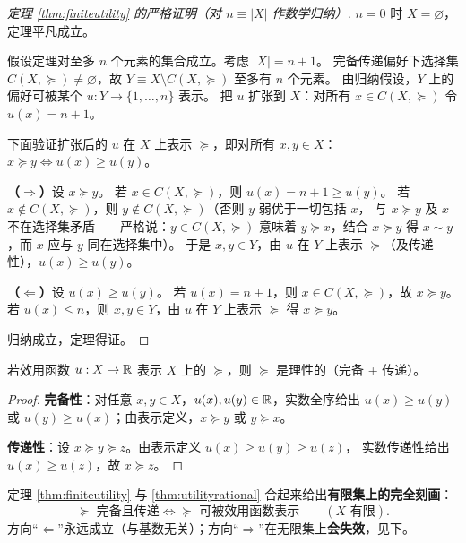 \begin{proof}[定理 \ref{thm:finiteutility} 的严格证明（对 $n\equiv|X|$ 作数学归纳）]
$n=0$ 时 $X=\varnothing$，定理平凡成立。

假设定理对至多 $n$ 个元素的集合成立。考虑 $|X|=n+1$。
完备传递偏好下选择集 $C(X,\succeq)\neq\varnothing$，故
$Y\equiv X\setminus C(X,\succeq)$ 至多有 $n$ 个元素。
由归纳假设，$Y$ 上的偏好可被某个 $u: Y\to\{1,\dots,n\}$ 表示。
把 $u$ 扩张到 $X$：对所有 $x\in C(X,\succeq)$ 令 $u(x)=n+1$。

下面验证扩张后的 $u$ 在 $X$ 上表示 $\succeq$，即对所有 $x,y\in X$：
$x\succeq y \iff u(x)\ge u(y)$。

\textbf{（$\Rightarrow$）}设 $x\succeq y$。
若 $x\in C(X,\succeq)$，则 $u(x)=n+1\ge u(y)$。
若 $x\notin C(X,\succeq)$，则 $y\notin C(X,\succeq)$（否则 $y$ 弱优于一切包括 $x$，
与 $x\succeq y$ 及 $x$ 不在选择集矛盾——严格说：$y\in C(X,\succeq)$ 意味着
$y\succeq x$，结合 $x\succeq y$ 得 $x\sim y$，而 $x$ 应与 $y$ 同在选择集中）。
于是 $x,y\in Y$，由 $u$ 在 $Y$ 上表示 $\succeq$（及传递性），$u(x)\ge u(y)$。

\textbf{（$\Leftarrow$）}设 $u(x)\ge u(y)$。
若 $u(x)=n+1$，则 $x\in C(X,\succeq)$，故 $x\succeq y$。
若 $u(x)\le n$，则 $x,y\in Y$，由 $u$ 在 $Y$ 上表示 $\succeq$ 得 $x\succeq y$。

归纳成立，定理得证。
\end{proof}

\begin{theorem}[效用表示蕴含理性]\label{thm:utilityrational}
若效用函数 $u: X\to\mathbb{R}$ 表示 $X$ 上的 $\succeq$，则 $\succeq$ 是理性的（完备 + 传递）。
\end{theorem}

\begin{proof}
\textbf{完备性}：对任意 $x,y\in X$，$u(x),u(y)\in\mathbb{R}$，实数全序给出 $u(x)\ge u(y)$ 或
$u(y)\ge u(x)$；由表示定义，$x\succeq y$ 或 $y\succeq x$。

\textbf{传递性}：设 $x\succeq y\succeq z$。由表示定义 $u(x)\ge u(y)\ge u(z)$，
实数传递性给出 $u(x)\ge u(z)$，故 $x\succeq z$。
\end{proof}

\begin{remark}
定理 \ref{thm:finiteutility} 与 \ref{thm:utilityrational} 合起来给出\textbf{有限集上的完全刻画}：
\[
\succeq \text{ 完备且传递} \iff \succeq \text{ 可被效用函数表示} \qquad (X \text{ 有限}).
\]
方向“$\Leftarrow$”永远成立（与基数无关）；方向“$\Rightarrow$”在无限集上\textbf{会失效}，见下。
\end{remark}

